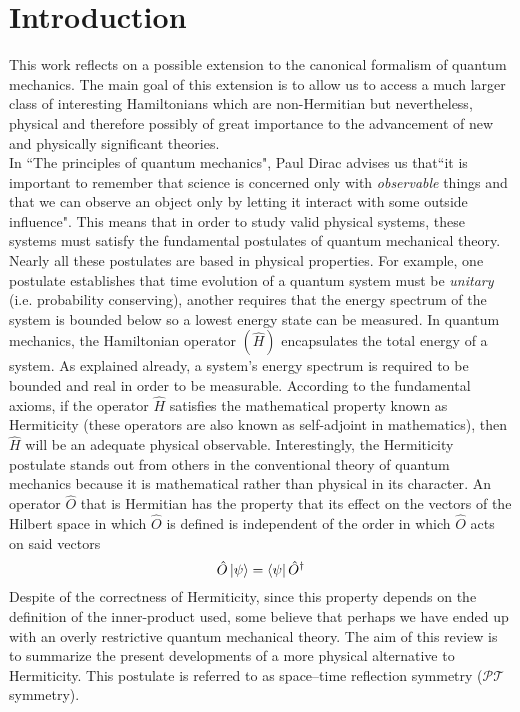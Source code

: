 \documentclass[12pt, a4paper]{report}
\newcommand\PT{\(\mathcal{PT}\)}
\begin{document}
\chapter{Introduction}\label{Introduction}
This work reflects on a possible extension to the canonical formalism of quantum mechanics. The main goal of this extension is to allow us to access a much larger class of interesting Hamiltonians which are non-Hermitian but nevertheless, physical and therefore possibly of great importance to the advancement of new and physically significant theories.\\
In ``The principles of quantum mechanics", Paul Dirac advises us that``it is important to remember that science is concerned only with \textit{observable} things and that we can observe an object only by letting it interact with some outside influence"\cite{POQM}. This means that in order to study valid physical systems, these systems must satisfy the fundamental postulates of quantum mechanical theory. Nearly all these postulates are based in physical properties. For example, one postulate establishes that time evolution of a quantum system must be \textit{unitary} (i.e. probability conserving), another requires that the energy spectrum of the system is bounded below so a lowest energy state can be measured. In quantum mechanics, the Hamiltonian operator $(\hat{H})$ encapsulates the total energy of a system. As explained already, a system's energy spectrum is required to be bounded and real in order to be measurable. According to the fundamental axioms, if the operator $\hat{H}$ satisfies the mathematical property known as Hermiticity (these operators are also known as self-adjoint in mathematics), then $\hat{H}$ will be an adequate physical observable. Interestingly, the Hermiticity postulate stands out from others in the conventional theory of quantum mechanics because it is mathematical rather than physical in its character\cite{MakingSense}.
An operator $\hat{O}$ that is Hermitian has the property that its effect on the vectors of the Hilbert space in which $\hat{O}$ is defined is independent of the order in which $\hat{O}$ acts on said vectors\cite{Jones-Smith}
\begin{equation}\label{eq:1}
\hat{O}\ket{\psi} = \bra{\psi}\hat{O}^{\dagger}
\end{equation}
Despite of the correctness of Hermiticity, since this property depends on the definition of the inner-product used, some believe that perhaps we have ended up with an overly restrictive quantum mechanical theory.  
The aim of this review is to summarize the present developments of a more physical alternative to Hermiticity. This postulate is referred to as space–time reflection symmetry (\PT\:symmetry)\cite{MustaHbeHermitian}. 
\end{document}
